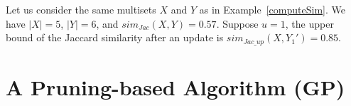 \begin{example} 
Let us consider the same multisets $X$ and $Y$ as in Example~\ref{computeSim}. We have $|X|=5$, $|Y|=6$, and $sim_{Jac}(X, Y) = 0.57$. Suppose $u=1$, the upper bound of the Jaccard similarity after an update is $sim_{Jac\_up}(X, Y_1') = 0.85$.
\end{example}



\section{A Pruning-based Algorithm (GP)}
\label{sec:pruning-method}

